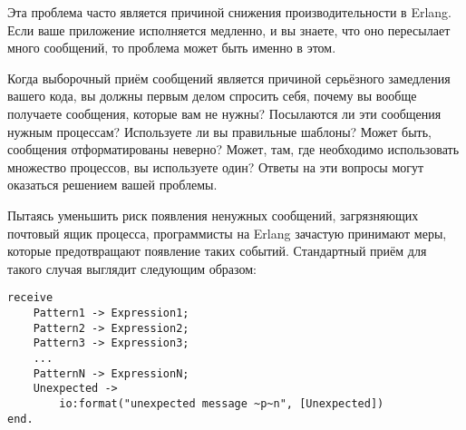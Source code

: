 Эта проблема часто является причиной снижения производительности в Erlang.
Если ваше приложение исполняется медленно, и вы знаете, что оно пересылает много сообщений, то проблема может быть именно в этом.

Когда выборочный приём сообщений является причиной серьёзного замедления вашего кода, вы должны первым делом спросить себя, почему вы вообще получаете сообщения, которые вам не нужны?
Посылаются ли эти сообщения нужным процессам?
Используете ли вы правильные шаблоны?
Может быть, сообщения отформатированы неверно?
Может, там, где необходимо использовать множество процессов, вы используете один?
Ответы на эти вопросы могут оказаться решением вашей проблемы.

Пытаясь уменьшить риск появления ненужных сообщений, загрязняющих почтовый ящик процесса, программисты на Erlang зачастую принимают меры, которые предотвращают появление таких событий.
Стандартный приём для такого случая выглядит следующим образом:
\begin{lstlisting}[style=erlang]
receive
    Pattern1 -> Expression1;
    Pattern2 -> Expression2;
    Pattern3 -> Expression3;
    ...
    PatternN -> ExpressionN;
    Unexpected ->
        io:format("unexpected message ~p~n", [Unexpected])
end.
\end{lstlisting}
